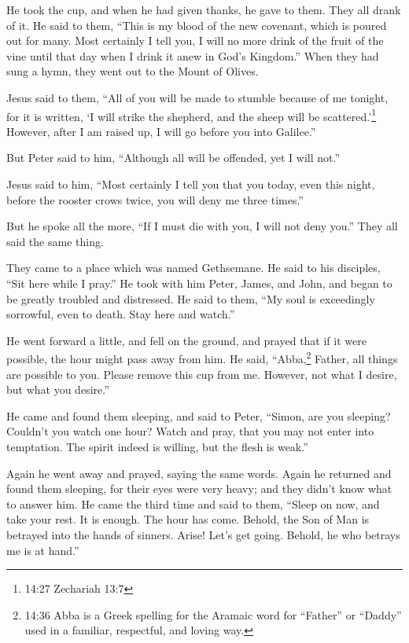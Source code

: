  He took the cup, and when he had given thanks, he gave to
them. They all drank of it.  He said to them, ``This is my
blood of the new covenant, which is poured out for many. 
Most certainly I tell you, I will no more drink of the fruit of the vine
until that day when I drink it anew in God's Kingdom.'' 
When they had sung a hymn, they went out to the Mount of Olives.

 Jesus said to them, ``All of you will be made to stumble
because of me tonight, for it is written, `I will strike the shepherd,
and the sheep will be scattered.'\footnote{14:27 Zechariah 13:7}
 However, after I am raised up, I will go before you into
Galilee.''

 But Peter said to him, ``Although all will be offended,
yet I will not.''

 Jesus said to him, ``Most certainly I tell you that you
today, even this night, before the rooster crows twice, you will deny me
three times.''

 But he spoke all the more, ``If I must die with you, I
will not deny you.'' They all said the same thing.

 They came to a place which was named Gethsemane. He said
to his disciples, ``Sit here while I pray.''  He took with
him Peter, James, and John, and began to be greatly troubled and
distressed.  He said to them, ``My soul is exceedingly
sorrowful, even to death. Stay here and watch.''

 He went forward a little, and fell on the ground, and
prayed that if it were possible, the hour might pass away from him.
 He said, ``Abba,\footnote{14:36 Abba is a Greek spelling
  for the Aramaic word for ``Father'' or ``Daddy'' used in a familiar,
  respectful, and loving way.} Father, all things are possible to you.
Please remove this cup from me. However, not what I desire, but what you
desire.''

 He came and found them sleeping, and said to Peter,
``Simon, are you sleeping? Couldn't you watch one hour? 
Watch and pray, that you may not enter into temptation. The spirit
indeed is willing, but the flesh is weak.''

 Again he went away and prayed, saying the same words.
 Again he returned and found them sleeping, for their eyes
were very heavy; and they didn't know what to answer him. 
He came the third time and said to them, ``Sleep on now, and take your
rest. It is enough. The hour has come. Behold, the Son of Man is
betrayed into the hands of sinners.  Arise! Let's get
going. Behold, he who betrays me is at hand.''

